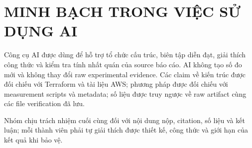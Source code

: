 \chapter{MINH BẠCH TRONG VIỆC SỬ DỤNG AI}
\label{app:ai-transparency}

Công cụ AI được dùng để hỗ trợ tổ chức cấu trúc, biên tập diễn đạt, giải thích
công thức và kiểm tra tính nhất quán của source báo cáo. AI không tạo số đo mới
và không thay đổi raw experimental evidence. Các claim về kiến trúc được đối
chiếu với Terraform và tài liệu AWS; phương pháp được đối chiếu với measurement
scripts và metadata; số liệu được truy ngược về raw artifact cùng các file
verification đã lưu.

Nhóm chịu trách nhiệm cuối cùng đối với nội dung nộp, citation, số liệu và kết
luận; mỗi thành viên phải tự giải thích được thiết kế, công thức và giới hạn của
kết quả khi bảo vệ.
